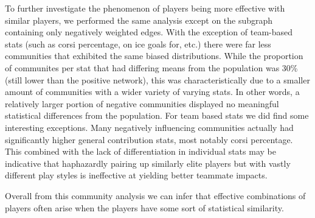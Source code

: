 \documentclass{article}
\begin{document}
To further investigate the phenomenon of players being more effective with similar players, we performed the same analysis except on the subgraph containing only negatively weighted edges.
With the exception of team-based stats (such as corsi percentage, on ice goals for, etc.) there were far less communities that exhibited the same biased distributions.
While the proportion of communites per stat that had differing means from the population was 30\% (still lower than the positive network), this was characteristically due to a smaller amount of communities with a wider variety of varying stats.
In other words, a relatively larger portion of negative communities displayed no meaningful statistical differences from the population.
For team based stats we did find some interesting exceptions.
Many negatively influencing communities actually had significantly higher general contribution stats, most notably corsi percentage.
This combined with the lack of differentiation in individual stats may be indicative that haphazardly pairing up similarly elite players but with vastly different play styles is ineffective at yielding better teammate impacts.

Overall from this community analysis we can infer that effective combinations of players often arise when the players have some sort of statistical similarity.
\end{document}
